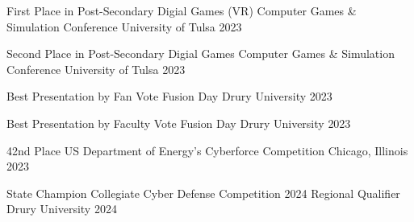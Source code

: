 



\begin{cvhonors}

  \cvhonor
    {First Place in Post-Secondary Digial Games (VR)} %
    {Computer Games \& Simulation Conference} %
    {University of Tulsa} %
    {2023} %

  \cvhonor
    {Second Place in Post-Secondary Digial Games} %
    {Computer Games \& Simulation Conference} %
    {University of Tulsa} %
    {2023} %

  \cvhonor
    {Best Presentation by Fan Vote} %
    {Fusion Day} %
    {Drury University} %
    {2023} %

  \cvhonor
    {Best Presentation by Faculty Vote} %
    {Fusion Day} %
    {Drury University} %
    {2023} %

  \cvhonor
    {42nd Place} %
    {US Department of Energy's Cyberforce Competition} %
    {Chicago, Illinois} %
    {2023} %

  \cvhonor
    {State Champion} %
    {Collegiate Cyber Defense Competition 2024 Regional Qualifier} %
    {Drury University} %
    {2024} %

\end{cvhonors}
